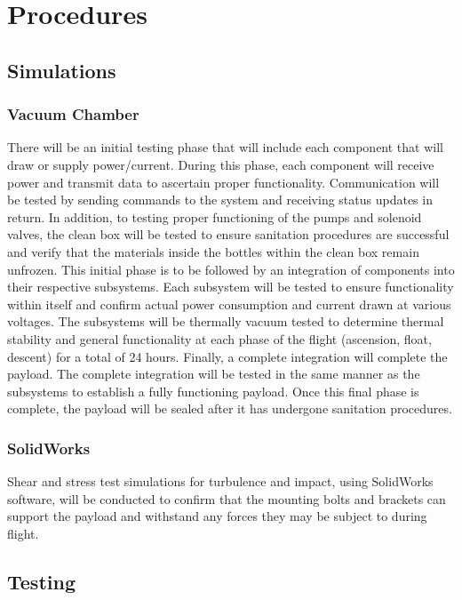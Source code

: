 \section{Procedures}
\label{sec:Procedures}

\subsection{Simulations}

\subsubsection{Vacuum Chamber}
There will be an initial testing phase that will include each component that will draw or supply power/current. During this phase, each component will receive power and transmit data to ascertain proper functionality. Communication will be tested by sending commands to the system and receiving status updates in return. In addition, to testing proper functioning of the pumps and solenoid valves, the clean box will be tested to ensure sanitation procedures are successful and verify that the materials inside the bottles within the clean box remain unfrozen. This initial phase is to be followed by an integration of components into their respective subsystems. Each subsystem will be tested to ensure functionality within itself and confirm actual power consumption and current drawn at various voltages. The subsystems will be thermally vacuum tested to determine thermal stability and general functionality at each phase of the flight (ascension, float, descent) for a total of 24 hours. Finally, a complete integration will complete the payload. The complete integration will be tested in the same manner as the subsystems to establish a fully functioning payload. Once this final phase is complete, the payload will be sealed after it has undergone sanitation procedures.

\subsubsection{SolidWorks}
Shear and stress test simulations for turbulence and impact, using SolidWorks~\cite{SolidWorks} software, will be conducted to confirm that the mounting bolts and brackets can support the payload and withstand any forces they may be subject to during flight.

\subsection{Testing}

